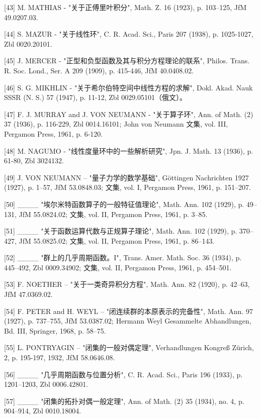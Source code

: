 {[}43{]} M. MATHIAS - "关于正傅里叶积分", Math. Z. 16 (1923), p. 103--125, JfM 49.0207.03.

{[}44{]} S. MAZUR - "关于线性环", C. R. Acad. Sci., Paris 207 (1938), p. 1025-1027, Zbl 0020.20101.

{[}45{]} J. MERCER - "正型和负型函数及其与积分方程理论的联系", Philos. Trans. R. Soc. Lond., Ser. A 209 (1909), p. 415-446, JfM 40.0408.02.

{[}46{]} S. G. MIKHLIN - "关于希尔伯特空间中线性方程的求解", Dokl. Akad. Nauk SSSR (N. S.) 57 (1947), p. 11-12, Zbl 0029.05101（俄文）。

{[}47{]} F. J. MURRAY and J. VON NEUMANN - "关于算子环", Ann. of Math. (2) 37 (1936), p. 116-229, Zbl 0014.16101; John von Neumann 文集, vol. III, Pergamon Press, 1961, p. 6-120.

{[}48{]} M. NAGUMO - "线性度量环中的一些解析研究", Jpn. J. Math. 13 (1936), p. 61-80, Zbl 3024132.

{[}49{]} J. VON NEUMANN -- "量子力学的数学基础", Göttingen Nachrichten 1927 (1927), p. 1--57, JfM 53.0848.03; 文集, vol. I, Pergamon Press, 1961, p. 151--207.

{[}50{]} \_\_\_\_ "埃尔米特函数算子的一般特征值理论", Math. Ann. 102 (1929), p. 49--131, JfM 55.0824.02; 文集, vol. II, Pergamon Press, 1961, p. 3--85.

{[}51{]} \_\_\_\_ "关于函数运算代数与正规算子理论", Math. Ann. 102 (1929), p. 370--427, JfM 55.0825.02; 文集, vol. II, Pergamon Press, 1961, p. 86--143.

{[}52{]} \_\_\_\_ "群上的几乎周期函数。I", Trans. Amer. Math. Soc. 36 (1934), p. 445--492, Zbl 0009.34902; 文集, vol. II, Pergamon Press, 1961, p. 454--501.

{[}53{]} F. NOETHER -- "关于一类奇异积分方程", Math. Ann. 82 (1920), p. 42--63, JfM 47.0369.02.

{[}54{]} F. PETER and H. WEYL -- "闭连续群的本原表示的完备性", Math. Ann. 97 (1927), p. 737--755, JfM 53.0387.02; Hermann Weyl Gesammelte Abhandlungen, Bd. III, Springer, 1968, p. 58--75.

{[}55{]} L. PONTRYAGIN -- "闭集的一般对偶定理", Verhandlungen Kongreß Zürich, 2, p. 195-197, 1932, JfM 58.0646.08.

{[}56{]} \_\_\_\_ "几乎周期函数与位置分析", C. R. Acad. Sci., Paris 196 (1933), p. 1201--1203, Zbl 0006.42801.

{[}57{]} \_\_\_\_ "闭集的拓扑对偶一般定理", Ann. of Math. (2) 35 (1934), no. 4, p. 904--914, Zbl 0010.18004.


